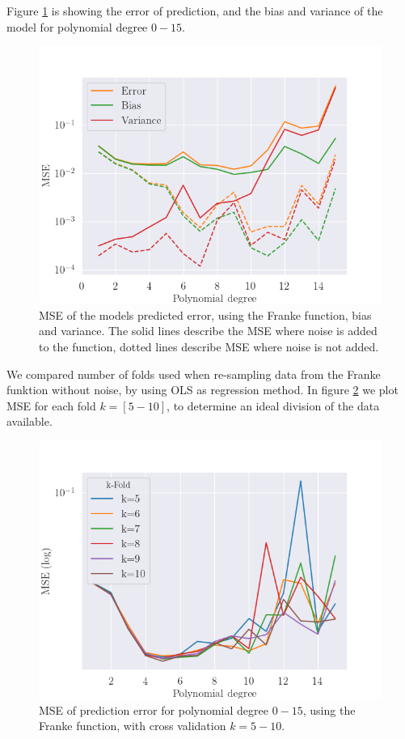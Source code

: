 %
\noindent Figure \ref{fig:bias_variance} is showing the error of prediction, and the bias and variance of the model for polynomial degree $0-15$. 
% 
\begin{figure}[H]
    \centering
    \includegraphics[width=\linewidth]{images/bias_variance.png}
    \caption{MSE of the models predicted error, using the Franke function, bias and variance. The solid lines describe the MSE where noise is added to the function, dotted lines describe MSE where noise is not added.}
    \label{fig:bias_variance}
\end{figure}
\noindent We compared number of folds used when re-sampling data from the Franke funktion without noise, by using OLS as regression method. In figure \ref{fig:cv_kfolds} we plot MSE for each fold $k=[5-10]$, to determine an ideal division of the data available.
\begin{figure}[H]
	\centering
	\includegraphics[width=\linewidth]{images/cv_kfolds.png}
	\caption{MSE of prediction error for polynomial degree $0-15$, using the Franke function, with cross validation $k=5-10$.}
 \label{fig:cv_kfolds}
\end{figure}

